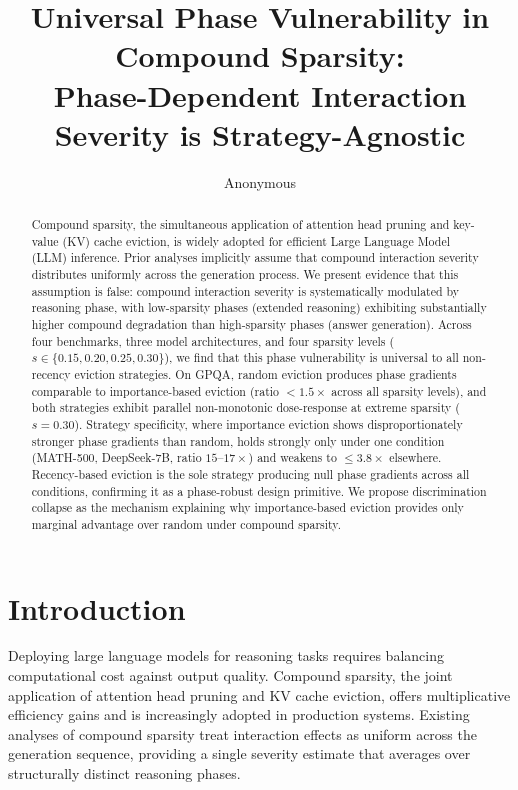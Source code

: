 \documentclass[11pt,a4paper]{article}
\title{Universal Phase Vulnerability in Compound Sparsity:\\Phase-Dependent Interaction Severity is Strategy-Agnostic}
\author{Anonymous}
\date{}
\begin{document}
\maketitle

\begin{abstract}
Compound sparsity, the simultaneous application of attention head pruning and key-value (KV) cache eviction, is widely adopted for efficient Large Language Model (LLM) inference. Prior analyses implicitly assume that compound interaction severity distributes uniformly across the generation process. We present evidence that this assumption is false: compound interaction severity is systematically modulated by reasoning phase, with low-sparsity phases (extended reasoning) exhibiting substantially higher compound degradation than high-sparsity phases (answer generation). Across four benchmarks, three model architectures, and four sparsity levels ($s \in \{0.15, 0.20, 0.25, 0.30\}$), we find that this phase vulnerability is universal to all non-recency eviction strategies. On GPQA, random eviction produces phase gradients comparable to importance-based eviction (ratio $<1.5\times$ across all sparsity levels), and both strategies exhibit parallel non-monotonic dose-response at extreme sparsity ($s=0.30$). Strategy specificity, where importance eviction shows disproportionately stronger phase gradients than random, holds strongly only under one condition (MATH-500, DeepSeek-7B, ratio $15$--$17\times$) and weakens to $\leq 3.8\times$ elsewhere. Recency-based eviction is the sole strategy producing null phase gradients across all conditions, confirming it as a phase-robust design primitive. We propose discrimination collapse as the mechanism explaining why importance-based eviction provides only marginal advantage over random under compound sparsity.
\end{abstract}

\section{Introduction}

Deploying large language models for reasoning tasks requires balancing computational cost against output quality. Compound sparsity, the joint application of attention head pruning and KV cache eviction, offers multiplicative efficiency gains and is increasingly adopted in production systems. Existing analyses of compound sparsity treat interaction effects as uniform across the generation sequence, providing a single severity estimate that averages over structurally distinct reasoning phases.
\end{document}
